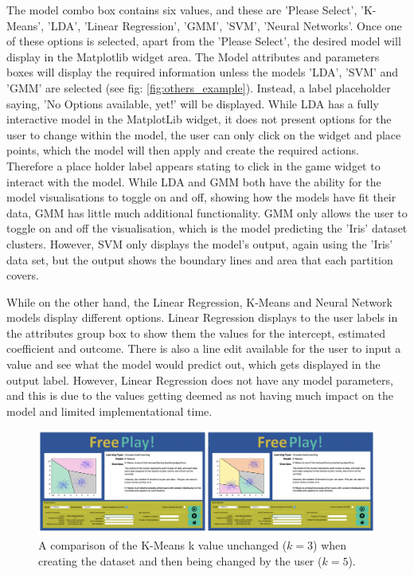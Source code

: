 		The model combo box contains six values, and these are 'Please Select', 'K-Means', 'LDA', 'Linear Regression', 'GMM', 'SVM', 'Neural Networks'. Once one of these options is selected, apart from the 'Please Select', the desired model will display in the Matplotlib widget area. The Model attributes and parameters boxes will display the required information unless the models 'LDA', 'SVM' and 'GMM' are selected (see fig: \ref{fig:others_example}). Instead, a label placeholder saying, 'No Options available, yet!' will be displayed. While LDA has a fully interactive model in the MatplotLib widget, it does not present options for the user to change within the model, the user can only click on the widget and place points, which the model will then apply and create the required actions. Therefore a place holder label appears stating to click in the game widget to interact with the model. While LDA and GMM both have the ability for the model visualisations to toggle on and off, showing how the models have fit their data, GMM has little much additional functionality. GMM only allows the user to toggle on and off the visualisation, which is the model predicting the 'Iris' dataset clusters. However, SVM only displays the model's output, again using the 'Iris' data set, but the output shows the boundary lines and area that each partition covers.
		
		While on the other hand, the Linear Regression, K-Means and Neural Network models display different options. Linear Regression displays to the user labels in the attributes group box to show them the values for the intercept, estimated coefficient and outcome. There is also a line edit available for the user to input a value and see what the model would predict out, which gets displayed in the output label. However, Linear Regression does not have any model parameters, and this is due to the values getting deemed as not having much impact on the model and limited implementational time. 
		
		\begin{figure}[t]
			\begin{center}
				\includegraphics[width=15cm]{graphics/chaning_k_fp_example.png}
				\caption{A comparison of the K-Means k value unchanged ($k=3$) when creating the dataset and then being changed by the user ($k=5$).}
				\label{fig:km_example}
			\end{center}
		\end{figure}
		
